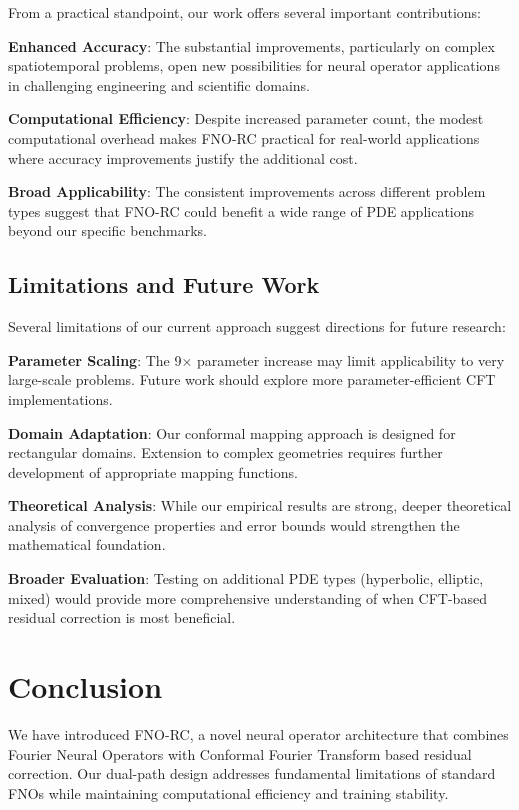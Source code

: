 \documentclass[11pt]{article}
\begin{document}
{{{From a practical standpoint, our work offers several important contributions:

\textbf{Enhanced Accuracy}: The substantial improvements, particularly on complex spatiotemporal problems, open new possibilities for neural operator applications in challenging engineering and scientific domains.

\textbf{Computational Efficiency}: Despite increased parameter count, the modest computational overhead makes FNO-RC practical for real-world applications where accuracy improvements justify the additional cost.

\textbf{Broad Applicability}: The consistent improvements across different problem types suggest that FNO-RC could benefit a wide range of PDE applications beyond our specific benchmarks.

\subsection{Limitations and Future Work}

Several limitations of our current approach suggest directions for future research:

\textbf{Parameter Scaling}: The 9× parameter increase may limit applicability to very large-scale problems. Future work should explore more parameter-efficient CFT implementations.

\textbf{Domain Adaptation}: Our conformal mapping approach is designed for rectangular domains. Extension to complex geometries requires further development of appropriate mapping functions.

\textbf{Theoretical Analysis}: While our empirical results are strong, deeper theoretical analysis of convergence properties and error bounds would strengthen the mathematical foundation.

\textbf{Broader Evaluation}: Testing on additional PDE types (hyperbolic, elliptic, mixed) would provide more comprehensive understanding of when CFT-based residual correction is most beneficial.

\section{Conclusion}

We have introduced FNO-RC, a novel neural operator architecture that combines Fourier Neural Operators with Conformal Fourier Transform based residual correction. Our dual-path design addresses fundamental limitations of standard FNOs while maintaining computational efficiency and training stability.

}}}
\end{document}
